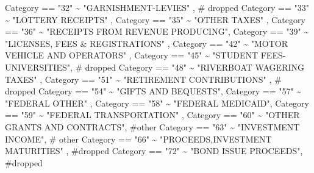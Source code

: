 \documentclass[
  letterpaper,
  DIV=11,
  numbers=noendperiod]{scrreport}
\newenvironment{Shaded}{\begin{snugshade}}{\end{snugshade}}
\newcommand{\CommentTok}[1]{\textcolor[rgb]{0.37,0.37,0.37}{#1}}
\newcommand{\NormalTok}[1]{\textcolor[rgb]{0.00,0.23,0.31}{#1}}
\newcommand{\SpecialCharTok}[1]{\textcolor[rgb]{0.37,0.37,0.37}{#1}}
\newcommand{\StringTok}[1]{\textcolor[rgb]{0.13,0.47,0.30}{#1}}
\begin{document}
\begin{Shaded}
\begin{Highlighting}[]
\NormalTok{    Category }\SpecialCharTok{==} \StringTok{"32"} \SpecialCharTok{\textasciitilde{}} \StringTok{"GARNISHMENT{-}LEVIES"}\NormalTok{ , }\CommentTok{\# dropped}
\NormalTok{    Category }\SpecialCharTok{==} \StringTok{"33"} \SpecialCharTok{\textasciitilde{}}  \StringTok{"LOTTERY RECEIPTS"}\NormalTok{ ,}
\NormalTok{    Category }\SpecialCharTok{==} \StringTok{"35"} \SpecialCharTok{\textasciitilde{}}  \StringTok{"OTHER TAXES"}\NormalTok{ ,}
\NormalTok{    Category }\SpecialCharTok{==} \StringTok{"36"} \SpecialCharTok{\textasciitilde{}}  \StringTok{"RECEIPTS FROM REVENUE PRODUCING"}\NormalTok{, }
\NormalTok{    Category }\SpecialCharTok{==} \StringTok{"39"} \SpecialCharTok{\textasciitilde{}}  \StringTok{"LICENSES, FEES \& REGISTRATIONS"}\NormalTok{ ,}
\NormalTok{    Category }\SpecialCharTok{==} \StringTok{"42"} \SpecialCharTok{\textasciitilde{}}  \StringTok{"MOTOR VEHICLE AND OPERATORS"}\NormalTok{ ,}
\NormalTok{    Category }\SpecialCharTok{==} \StringTok{"45"} \SpecialCharTok{\textasciitilde{}}  \StringTok{"STUDENT FEES{-}UNIVERSITIES"}\NormalTok{,   }\CommentTok{\# dropped}
\NormalTok{    Category }\SpecialCharTok{==} \StringTok{"48"} \SpecialCharTok{\textasciitilde{}}  \StringTok{"RIVERBOAT WAGERING TAXES"}\NormalTok{ ,}
\NormalTok{    Category }\SpecialCharTok{==} \StringTok{"51"} \SpecialCharTok{\textasciitilde{}}  \StringTok{"RETIREMENT CONTRIBUTIONS"}\NormalTok{ , }\CommentTok{\# dropped}
\NormalTok{    Category }\SpecialCharTok{==} \StringTok{"54"} \SpecialCharTok{\textasciitilde{}} \StringTok{"GIFTS AND BEQUESTS"}\NormalTok{, }
\NormalTok{    Category }\SpecialCharTok{==} \StringTok{"57"} \SpecialCharTok{\textasciitilde{}}  \StringTok{"FEDERAL OTHER"}\NormalTok{ ,}
\NormalTok{    Category }\SpecialCharTok{==} \StringTok{"58"} \SpecialCharTok{\textasciitilde{}}  \StringTok{"FEDERAL MEDICAID"}\NormalTok{, }
\NormalTok{    Category }\SpecialCharTok{==} \StringTok{"59"} \SpecialCharTok{\textasciitilde{}}  \StringTok{"FEDERAL TRANSPORTATION"}\NormalTok{ ,}
\NormalTok{    Category }\SpecialCharTok{==} \StringTok{"60"} \SpecialCharTok{\textasciitilde{}}  \StringTok{"OTHER GRANTS AND CONTRACTS"}\NormalTok{, }\CommentTok{\#other}
\NormalTok{    Category }\SpecialCharTok{==} \StringTok{"63"} \SpecialCharTok{\textasciitilde{}}  \StringTok{"INVESTMENT INCOME"}\NormalTok{, }\CommentTok{\# other}
\NormalTok{    Category }\SpecialCharTok{==} \StringTok{"66"} \SpecialCharTok{\textasciitilde{}} \StringTok{"PROCEEDS,INVESTMENT MATURITIES"}\NormalTok{ , }\CommentTok{\#dropped}
\NormalTok{    Category }\SpecialCharTok{==} \StringTok{"72"} \SpecialCharTok{\textasciitilde{}} \StringTok{"BOND ISSUE PROCEEDS"}\NormalTok{,  }\CommentTok{\#dropped}

\end{Highlighting}
\end{Shaded}
\end{document}
